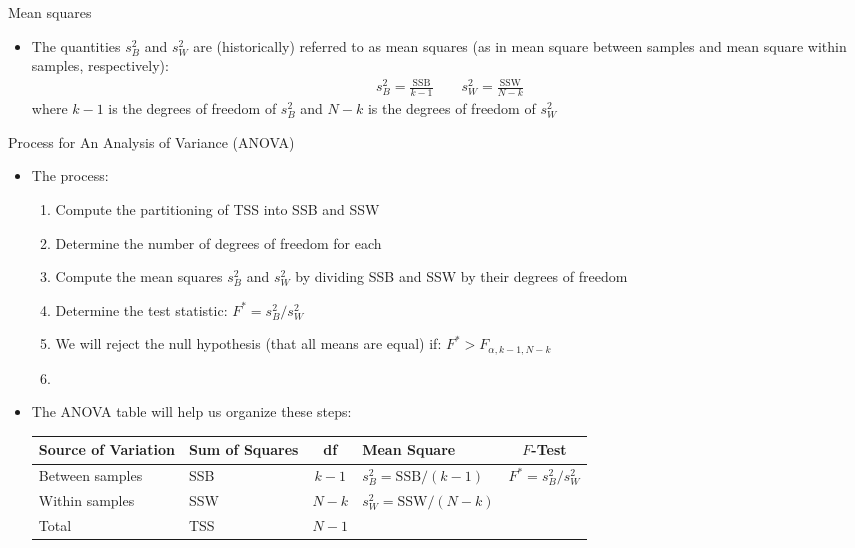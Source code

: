 \documentclass[xcolor=dvipsnames]{beamer}
\begin{document}
\begin{frame}{Mean squares}
	\begin{itemize}
		\item The quantities $s^2_B$ and $s^2_W$ are (historically) referred to as mean squares (as in mean square between samples and mean square within samples, respectively): \pause
		\begin{gather*}
			s^2_B = \frac{\text{SSB}}{k-1} \quad \quad s^2_W = \frac{\text{SSW}}{N-k}
		\end{gather*}
		where $k-1$ is the degrees of freedom of $s^2_B$ and $N-k$ is the degrees of freedom of $s^2_W$
	\end{itemize}
\end{frame}

\begin{frame}{Process for An Analysis of Variance (ANOVA)}
	\begin{itemize}
		\item The process: \pause
		\begin{enumerate}
			\item Compute the partitioning of TSS into SSB and SSW \pause
			\item Determine the number of degrees of freedom for each \pause
			\item Compute the mean squares $s_B^2$ and $s_W^2$ by dividing SSB and SSW by their degrees of freedom \pause
			\item Determine the test statistic: $F^* = s_B^2 / s_W^2$ \pause
			\item We will reject the null hypothesis (that all means are equal) if: $F^* > F_{\alpha, k-1, N-k}$ \pause
			\item[]
		\end{enumerate}
	\item The ANOVA table will help us organize these steps: \pause
	\vspace{2mm}
	\begin{center}
		{\scriptsize
		\begin{tabular}{lp{1.2cm}cp{2.5cm}c}
			\hline 
			\textbf{Source of Variation} & \textbf{Sum of Squares} & \textbf{df} & \textbf{Mean Square} & $F$-\textbf{Test} \\ \hline 
			Between samples & SSB & $k - 1$ & $s_B^2 = \text{SSB} / (k-1)$ & $F^* = s_B^2 / s_W^2$ \\
			Within samples & SSW & $N - k$ &  $s_W^2 = \text{SSW} / (N-k)$ & \\
			Total & TSS & $N-1$ & & \\ \hline
		\end{tabular}}
	\end{center}
	\end{itemize}
\end{frame}
\end{document}
